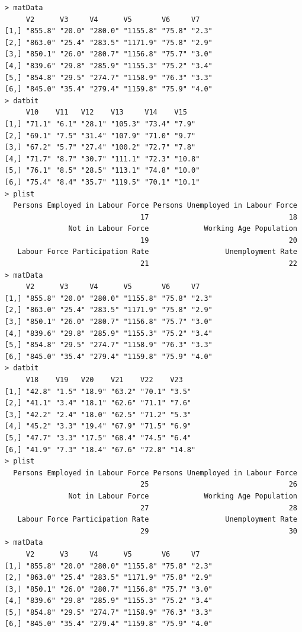 \documentclass[a4paper]{article}
\begin{document}
\begin{verbatim}
> matData 
     V2      V3     V4      V5       V6     V7   
[1,] "855.8" "20.0" "280.0" "1155.8" "75.8" "2.3"
[2,] "863.0" "25.4" "283.5" "1171.9" "75.8" "2.9"
[3,] "850.1" "26.0" "280.7" "1156.8" "75.7" "3.0"
[4,] "839.6" "29.8" "285.9" "1155.3" "75.2" "3.4"
[5,] "854.8" "29.5" "274.7" "1158.9" "76.3" "3.3"
[6,] "845.0" "35.4" "279.4" "1159.8" "75.9" "4.0"
> datbit 
     V10    V11   V12    V13     V14    V15   
[1,] "71.1" "6.1" "28.1" "105.3" "73.4" "7.9" 
[2,] "69.1" "7.5" "31.4" "107.9" "71.0" "9.7" 
[3,] "67.2" "5.7" "27.4" "100.2" "72.7" "7.8" 
[4,] "71.7" "8.7" "30.7" "111.1" "72.3" "10.8"
[5,] "76.1" "8.5" "28.5" "113.1" "74.8" "10.0"
[6,] "75.4" "8.4" "35.7" "119.5" "70.1" "10.1"
> plist 
  Persons Employed in Labour Force Persons Unemployed in Labour Force 
                                17                                 18 
               Not in Labour Force             Working Age Population 
                                19                                 20 
   Labour Force Participation Rate                  Unemployment Rate 
                                21                                 22 
> matData 
     V2      V3     V4      V5       V6     V7   
[1,] "855.8" "20.0" "280.0" "1155.8" "75.8" "2.3"
[2,] "863.0" "25.4" "283.5" "1171.9" "75.8" "2.9"
[3,] "850.1" "26.0" "280.7" "1156.8" "75.7" "3.0"
[4,] "839.6" "29.8" "285.9" "1155.3" "75.2" "3.4"
[5,] "854.8" "29.5" "274.7" "1158.9" "76.3" "3.3"
[6,] "845.0" "35.4" "279.4" "1159.8" "75.9" "4.0"
> datbit 
     V18    V19   V20    V21    V22    V23   
[1,] "42.8" "1.5" "18.9" "63.2" "70.1" "3.5" 
[2,] "41.1" "3.4" "18.1" "62.6" "71.1" "7.6" 
[3,] "42.2" "2.4" "18.0" "62.5" "71.2" "5.3" 
[4,] "45.2" "3.3" "19.4" "67.9" "71.5" "6.9" 
[5,] "47.7" "3.3" "17.5" "68.4" "74.5" "6.4" 
[6,] "41.9" "7.3" "18.4" "67.6" "72.8" "14.8"
> plist 
  Persons Employed in Labour Force Persons Unemployed in Labour Force 
                                25                                 26 
               Not in Labour Force             Working Age Population 
                                27                                 28 
   Labour Force Participation Rate                  Unemployment Rate 
                                29                                 30 
> matData 
     V2      V3     V4      V5       V6     V7   
[1,] "855.8" "20.0" "280.0" "1155.8" "75.8" "2.3"
[2,] "863.0" "25.4" "283.5" "1171.9" "75.8" "2.9"
[3,] "850.1" "26.0" "280.7" "1156.8" "75.7" "3.0"
[4,] "839.6" "29.8" "285.9" "1155.3" "75.2" "3.4"
[5,] "854.8" "29.5" "274.7" "1158.9" "76.3" "3.3"
[6,] "845.0" "35.4" "279.4" "1159.8" "75.9" "4.0"

\end{verbatim}
\end{document}
